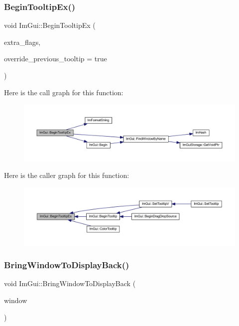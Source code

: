 \subsubsection{\texorpdfstring{Begin\+Tooltip\+Ex()}{BeginTooltipEx()}}
{\footnotesize\ttfamily void Im\+Gui\+::\+Begin\+Tooltip\+Ex (\begin{DoxyParamCaption}\item[{\mbox{\hyperlink{imgui_8h_a0b8e067ab4f7a818828c8d89e531addc}{Im\+Gui\+Window\+Flags}}}]{extra\+\_\+flags,  }\item[{bool}]{override\+\_\+previous\+\_\+tooltip = {\ttfamily true} }\end{DoxyParamCaption})}

Here is the call graph for this function\+:
\nopagebreak
\begin{figure}[H]
\begin{center}
\leavevmode
\includegraphics[width=350pt]{namespace_im_gui_a3189530b7795a9b99169eb95f36c516d_cgraph}
\end{center}
\end{figure}
Here is the caller graph for this function\+:
\nopagebreak
\begin{figure}[H]
\begin{center}
\leavevmode
\includegraphics[width=350pt]{namespace_im_gui_a3189530b7795a9b99169eb95f36c516d_icgraph}
\end{center}
\end{figure}
\mbox{\label{namespace_im_gui_a34d2363f631f1df5ab1a2a131ab98fa7}} 
\subsubsection{\texorpdfstring{Bring\+Window\+To\+Display\+Back()}{BringWindowToDisplayBack()}}
{\footnotesize\ttfamily void Im\+Gui\+::\+Bring\+Window\+To\+Display\+Back (\begin{DoxyParamCaption}\item[{\mbox{\hyperlink{struct_im_gui_window}{Im\+Gui\+Window}} $\ast$}]{window }\end{DoxyParamCaption})}

